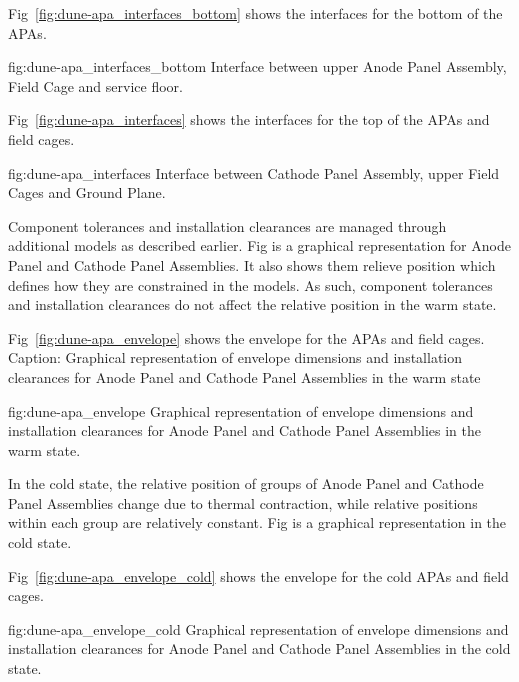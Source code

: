Fig~\ref{fig:dune-apa_interfaces_bottom} shows the interfaces for the bottom of the APAs.
\begin{dunefigure}{fig:dune-apa_interfaces_bottom}
  {Interface between upper Anode Panel Assembly, Field Cage and service floor.}
\end{dunefigure}

Fig~\ref{fig:dune-apa_interfaces} shows the interfaces for the top of the APAs and field cages.
\begin{dunefigure}{fig:dune-apa_interfaces}
  {Interface between Cathode Panel Assembly, upper Field Cages and Ground Plane.}
\end{dunefigure}

Component tolerances and installation clearances are managed through
additional models as described earlier. Fig is a graphical
representation for Anode Panel and Cathode Panel Assemblies. It also
shows them relieve position which defines how they are constrained in
the models. As such, component tolerances and installation clearances
do not affect the relative position in the warm state.

Fig~\ref{fig:dune-apa_envelope} shows the envelope for the APAs and field cages.
Caption: Graphical representation of envelope dimensions and
installation clearances for Anode Panel and Cathode Panel Assemblies
in the warm state
\begin{dunefigure}{fig:dune-apa_envelope} {Graphical
    representation of envelope dimensions and installation clearances
    for Anode Panel and Cathode Panel Assemblies in the warm state.}
\end{dunefigure}


In the cold state, the relative position of groups of Anode Panel and
Cathode Panel Assemblies change due to thermal contraction, while
relative positions within each group are relatively constant. Fig is a
graphical representation in the cold state.

Fig~\ref{fig:dune-apa_envelope_cold} shows the envelope for the cold APAs and field cages.
\begin{dunefigure}{fig:dune-apa_envelope_cold} {Graphical
    representation of envelope dimensions and installation clearances
    for Anode Panel and Cathode Panel Assemblies in the cold state.}
\end{dunefigure}

